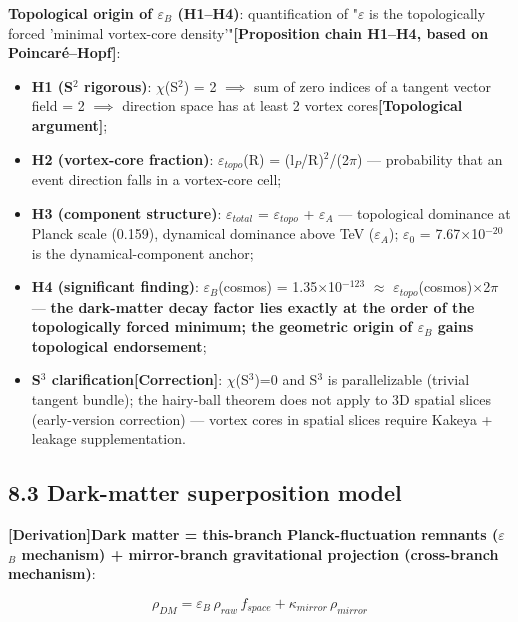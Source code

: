 \documentclass[12pt]{article}
\newcommand{\mtag}[1]{\textbf{[#1]}}
\newcommand{\up}[1]{\ensuremath{^{#1}}}
\newcommand{\down}[1]{\ensuremath{_{#1}}}
\begin{document}
\textbf{Topological origin of \ensuremath{\varepsilon}\down{B} (H1--H4)}: quantification of "\ensuremath{\varepsilon} is the topologically forced 'minimal vortex-core density'"\mtag{Proposition chain H1--H4, based on Poincar\'{e}--Hopf}:
\begin{itemize}
\item \textbf{H1 (S\up{2} rigorous)}: \ensuremath{\chi}(S\up{2}) = 2 \ensuremath{\implies} sum of zero indices of a tangent vector field = 2 \ensuremath{\implies} direction space has at least 2 vortex cores\mtag{Topological argument};
\item \textbf{H2 (vortex-core fraction)}: \ensuremath{\varepsilon}\down{topo}(R) = (l\down{P}/R)\up{2}/(2\ensuremath{\pi}) --- probability that an event direction falls in a vortex-core cell;
\item \textbf{H3 (component structure)}: \ensuremath{\varepsilon}\down{total} = \ensuremath{\varepsilon}\down{topo} + \ensuremath{\varepsilon}\down{A} --- topological dominance at Planck scale (0.159), dynamical dominance above TeV (\ensuremath{\varepsilon}\down{A}); \ensuremath{\varepsilon}\down{0} = 7.67\ensuremath{\times}10\up{-20} is the dynamical-component anchor;
\item \textbf{H4 (significant finding)}: \ensuremath{\varepsilon}\down{B}(cosmos) = 1.35\ensuremath{\times}10\up{-123} \ensuremath{\approx} \ensuremath{\varepsilon}\down{topo}(cosmos)\ensuremath{\times}2\ensuremath{\pi} --- \textbf{the dark-matter decay factor lies exactly at the order of the topologically forced minimum; the geometric origin of \ensuremath{\varepsilon}\down{B} gains topological endorsement};
\item \textbf{S\up{3} clarification\mtag{Correction}}: \ensuremath{\chi}(S\up{3})=0 and S\up{3} is parallelizable (trivial tangent bundle); the hairy-ball theorem does not apply to 3D spatial slices (early-version correction) --- vortex cores in spatial slices require Kakeya + leakage supplementation.
\end{itemize}

\subsection{8.3 Dark-matter superposition model}

\mtag{Derivation}\textbf{Dark matter = this-branch Planck-fluctuation remnants (\ensuremath{\varepsilon}\down{B} mechanism) + mirror-branch gravitational projection (cross-branch mechanism)}:

\[\rho_{DM} = \varepsilon_B\,\rho_{raw}\,f_{space} + \kappa_{mirror}\,\rho_{mirror}\]
\end{document}
